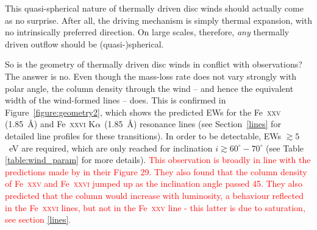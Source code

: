 \documentclass[a4paper,fleqn,usenatbib]{mnras}
\begin{document}
This quasi-spherical nature of thermally driven disc winds should
actually come as no surprise. After all, the driving mechanism is
simply thermal expansion, with no intrinsically preferred
direction. On large scales, therefore, {\em any} thermally driven
outflow should be (quasi-)spherical.

So is the geometry of thermally driven disc winds in conflict with
observations? The answer is no. Even though the mass-loss rate
does not vary strongly with polar angle, the column density
through the wind -- and hence the equivalent width of the
wind-formed lines -- does. This is confirmed in
Figure~\ref{figure:geometry2}, which shows the predicted EWs for the
Fe~\textsc{xxv} (1.85~{\AA}) and Fe~\textsc{xxvi} K$\rm{\alpha}$
(1.85~{\AA}) resonance lines (see Section~\ref{lines} for detailed
line profiles for these transitions). In order to be detectable, EWs
$\gtrsim 5$~eV are required, which are only reached for inclination
$i \gtrsim 60^\circ - 70^\circ$ (see Table \ref{table:wind_param} for
more details). \textcolor{red}{This observation is broadly in line with 
the predictions made by \cite{1996ApJ...461..767W} in their Figure
29. They also found that
the column density of Fe~\textsc{xxv} and Fe~\textsc{xxvi} jumped 
up as the inclination angle passed 45\degree. They also predicted
that the column would increase with luminosity, a behaviour reflected
in the Fe~\textsc{xxvi} lines, but not in the Fe~\textsc{xxv} line - this
latter is due to saturation, see section \ref{lines}.} 
\end{document}
